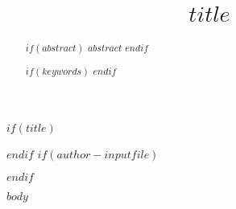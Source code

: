\documentclass[runningheads]{llncs}
\begin{document}
%
$if(title)$
\title{$title$}
$endif$
%
%
$if(author-inputfile)$

$endif$

%
\maketitle              %
%
\begin{abstract}
$if(abstract)$
$abstract$
$endif$

$if(keywords)$
$endif$
\end{abstract}
%
%
%
$body$


%
%
%
%
%
\printbibliography
\end{document}
